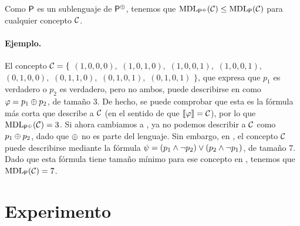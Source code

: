 Como ${\sf P}$ es un sublenguaje de ${\sf P}^\oplus$, tenemos que ${\rm MDL}_{{\sf P}^\oplus}(\mathcal{C})\leq{\rm MDL}_{{\sf P}}(\mathcal{C})$ para cualquier concepto $\mathcal{C}$.

\paragraph*{Ejemplo.}El concepto $\mathcal{C}=\{$ $(1,0,0,0),$ $(1,0,1,0),$ $(1,0,0,1),$ $(1,0,0,1),$ $(0,1,0,0),$ $(0,1,1,0),$ $(0,1,0,1),$ $(0,1,0,1)$ $\}$,
que expresa que $p_1$ es verdadero o $p_2$ es verdadero, pero no ambos, puede describirse en \gramboolxor como $\varphi=p_{1} \oplus p_{2}$, de tamaño 3. De hecho, se puede comprobar que esta es la fórmula más corta que describe a $\mathcal{C}$ (en el sentido de que $\llbracket \varphi\rrbracket=\mathcal{C}$), por lo que ${\rm MDL}_{{\sf P}^\oplus}(\mathcal{C})=3$. Si ahora cambiamos a \grambool, ya no podemos describir a $\mathcal{C}$ como $p_{1} \oplus p_{2}$, dado que $\oplus$ no es parte del lenguaje. Sin embargo, en \grambool, el concepto $\mathcal{C}$ puede describirse mediante la fórmula $\psi=(p_{1} \wedge \neg p_{2}) \vee (p_{2} \wedge \neg p_{1})$, de tamaño 7. Dado que esta fórmula tiene tamaño mínimo para ese concepto en \grambool, tenemos que ${\rm MDL}_{{\sf P}}(\mathcal{C})=7$.


\section{Experimento}


